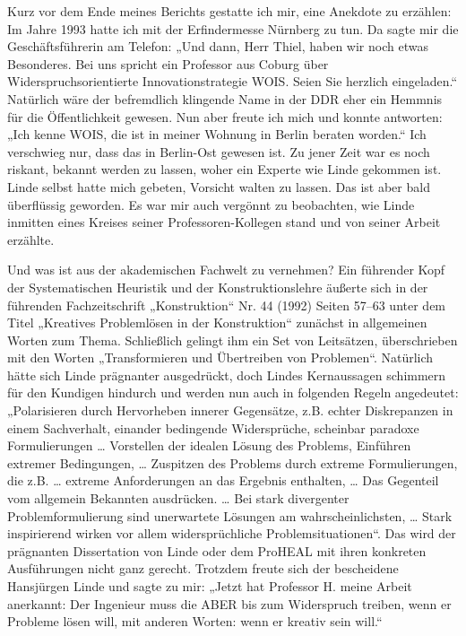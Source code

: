 \documentclass[12pt,a4paper]{article}
\begin{document}
Kurz vor dem Ende meines Berichts gestatte ich mir, eine Anekdote zu erzählen:
Im Jahre 1993 hatte ich mit der Erfindermesse Nürnberg zu tun.  Da sagte mir
die Geschäftsführerin am Telefon: „Und dann, Herr Thiel, haben wir noch etwas
Besonderes. Bei uns spricht ein Professor aus Coburg über
{\glq}Widerspruchsorientierte Innovationstrategie WOIS{\grq}. Seien Sie
herzlich eingeladen.“ Natürlich wäre der befremdlich klingende Name in der DDR
eher ein Hemmnis für die Öffentlichkeit gewesen. Nun aber freute ich mich und
konnte antworten: „Ich kenne WOIS, die ist in meiner Wohnung in Berlin beraten
worden.“ Ich verschwieg nur, dass das in Berlin-Ost gewesen ist. Zu jener Zeit
war es noch riskant, bekannt werden zu lassen, woher ein Experte wie Linde
gekommen ist. Linde selbst hatte mich gebeten, Vorsicht walten zu lassen. Das
ist aber bald überflüssig geworden. Es war mir auch vergönnt zu beobachten, wie
Linde inmitten eines Kreises seiner Professoren-Kollegen stand und von seiner
Arbeit erzählte.

Und was ist aus der akademischen Fachwelt zu vernehmen? Ein führender Kopf der
Systematischen Heuristik und der Konstruktionslehre äußerte sich in der
führenden Fachzeitschrift „Konstruktion“ Nr. 44 (1992) Seiten 57–63 unter dem
Titel „Kreatives Problemlösen in der Konstruktion“ zunächst in allgemeinen
Worten zum Thema. Schließlich gelingt ihm ein Set von Leitsätzen, überschrieben
mit den Worten „Transformieren und Übertreiben von Problemen“. Natürlich hätte
sich Linde prägnanter ausgedrückt, doch Lindes Kernaussagen schimmern für den
Kundigen hindurch und werden nun auch in folgenden Regeln angedeutet:
„Polarisieren durch Hervorheben innerer Gegensätze, z.B. echter Diskrepanzen in
einem Sachverhalt, einander bedingende Widersprüche, scheinbar paradoxe
Formulierungen {\ldots} Vorstellen der idealen Lösung des Problems, Einführen
extremer Bedingungen, {\ldots} Zuspitzen des Problems durch extreme
Formulierungen, die z.B. {\ldots} extreme Anforderungen an das Ergebnis
enthalten, {\ldots} Das Gegenteil vom allgemein Bekannten ausdrücken. {\ldots}
Bei stark divergenter Problemformulierung sind unerwartete Lösungen am
wahrscheinlichsten, {\ldots} Stark inspirierend wirken vor allem
widersprüchliche Problemsituationen“. Das wird der prägnanten Dissertation von
Linde oder dem ProHEAL mit ihren konkreten Ausführungen nicht ganz gerecht.
Trotzdem freute sich der bescheidene Hansjürgen Linde und sagte zu mir: „Jetzt
hat Professor H. meine Arbeit anerkannt: Der Ingenieur muss die ABER bis zum
Widerspruch treiben, wenn er Probleme lösen will, mit anderen Worten: wenn er
kreativ sein will.“
\end{document}
